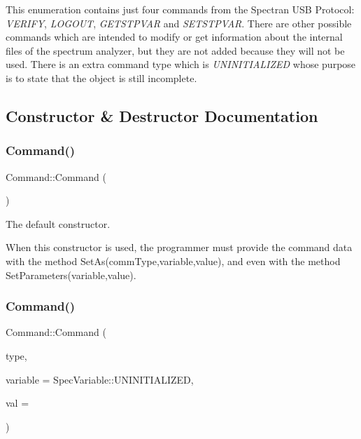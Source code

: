 This enumeration contains just four commands from the Spectran U\+SB Protocol\+: {\itshape V\+E\+R\+I\+FY}, {\itshape L\+O\+G\+O\+UT}, {\itshape G\+E\+T\+S\+T\+P\+V\+AR} and {\itshape S\+E\+T\+S\+T\+P\+V\+AR}. There are other possible commands which are intended to modify or get information about the internal files of the spectrum analyzer, but they are not added because they will not be used. There is an extra command type which is {\itshape U\+N\+I\+N\+I\+T\+I\+A\+L\+I\+Z\+ED} whose purpose is to state that the object is still incomplete. 

\subsection{Constructor \& Destructor Documentation}
\mbox{\label{classCommand_a18df2d81039392daeb0b78c346a70537}} 
\subsubsection{\texorpdfstring{Command()}{Command()}\hspace{0.1cm}{\footnotesize\ttfamily [1/3]}}
{\footnotesize\ttfamily Command\+::\+Command (\begin{DoxyParamCaption}{ }\end{DoxyParamCaption})}



The default constructor. 

When this constructor is used, the programmer must provide the command data with the method {\ttfamily Set\+As(comm\+Type,variable,value)}, and even with the method {\ttfamily Set\+Parameters(variable,value)}. \mbox{\label{classCommand_aa092997d602d3e2e4d0036ce2d4853c6}} 
\subsubsection{\texorpdfstring{Command()}{Command()}\hspace{0.1cm}{\footnotesize\ttfamily [2/3]}}
{\footnotesize\ttfamily Command\+::\+Command (\begin{DoxyParamCaption}\item[{const \hyperlink{classCommand_a658ae4be30c6dd9b673e467908acaeb5}{Command\+Type}}]{type,  }\item[{const \hyperlink{Spectran_8h_a0411392c90f0c8f0d8e44a4e94259276}{Spec\+Variable}}]{variable = {\ttfamily SpecVariable\+:\+:UNINITIALIZED},  }\item[{const float}]{val = {} }\end{DoxyParamCaption})}



